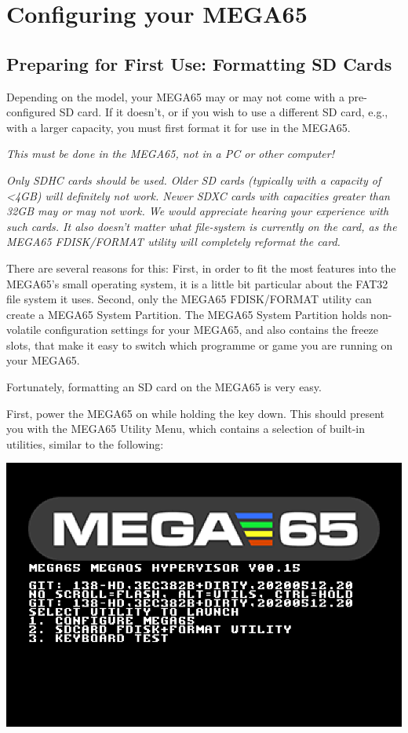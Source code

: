\chapter{Configuring your MEGA65}
\label{cha:configuring}

\section{Preparing for First Use: Formatting SD Cards}

Depending on the model, your MEGA65 may or may not come with a pre-configured SD card.
If it doesn't, or if you wish to use a different SD card, e.g., with a
larger capacity, you must first format it for use in the MEGA65.

{\em This must be done in the MEGA65, not in a PC or other computer!}

{\em Only SDHC cards should be used. Older SD cards (typically with
  a capacity of <4GB) will definitely not work.  Newer SDXC cards with
  capacities greater than 32GB may or may not work.  We would
  appreciate hearing your experience with such cards. It also doesn't
  matter what file-system is currently on the card, as the MEGA65
  FDISK/FORMAT utility will completely reformat the card.}

There are several reasons for this: First, in order to fit the most
features into the MEGA65's small operating system, it is a little bit
particular about the FAT32 file system it uses. Second, only the
MEGA65 FDISK/FORMAT utility can create a MEGA65 System Partition. The
MEGA65 System Partition holds non-volatile configuration settings for
your MEGA65, and also contains the freeze slots, that make it easy to
switch which programme or game you are running on your MEGA65.

Fortunately, formatting an SD card on the MEGA65 is very easy.

First, power the MEGA65 on while holding the  key down.
This should present you with the MEGA65 Utility Menu, which contains a
selection of built-in utilities, similar to the following:

\includegraphics[width=\linewidth]{images/ss-utilmenu.png}

